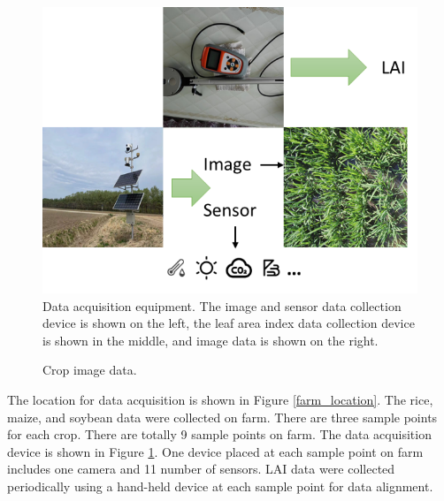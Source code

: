 \documentclass[acmsmall,manuscript, screen, review]{acmart}
\begin{document}
\begin{figure}[htbp]
  \centering
  \includegraphics[width=0.5\linewidth]{pic/data_acquisition_equipment.png}
  \caption{Data acquisition equipment. The image and sensor data collection device is shown on the left, the leaf area index data collection device is shown in the middle, and image data is shown on the right.}
  \label{data_collection_equipment}
\end{figure}


\begin{figure}[htbp]
  \centering
  \hfill
  \caption{Crop image data.}
  \label{crop}
\end{figure}

The location for data acquisition is shown in Figure \ref{farm_location}. The rice, maize, and soybean data were collected on farm. There are three sample points for each crop. There are totally 9 sample points on farm. The data acquisition device is shown in Figure \ref{data_collection_equipment}. One device placed at each sample point on farm includes one camera and 11 number of sensors. LAI data were collected periodically using a hand-held device at each sample point for data alignment.
\end{document}

